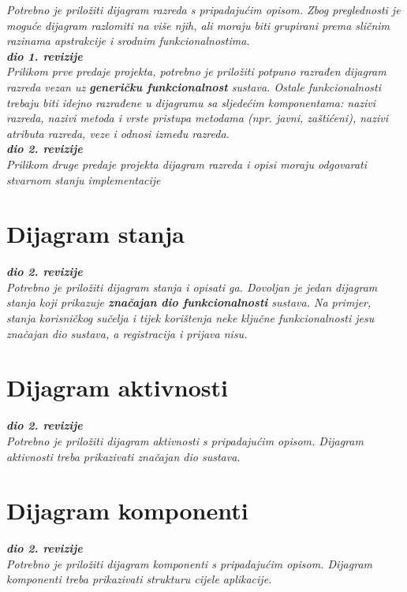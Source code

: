 			\textit{Potrebno je priložiti dijagram razreda s pripadajućim opisom. Zbog preglednosti je moguće dijagram razlomiti na više njih, ali moraju biti grupirani prema sličnim razinama apstrakcije i srodnim funkcionalnostima.}\\
			
			\textbf{\textit{dio 1. revizije}}\\
			
			\textit{Prilikom prve predaje projekta, potrebno je priložiti potpuno razrađen dijagram razreda vezan uz \textbf{generičku funkcionalnost} sustava. Ostale funkcionalnosti trebaju biti idejno razrađene u dijagramu sa sljedećim komponentama: nazivi razreda, nazivi metoda i vrste pristupa metodama (npr. javni, zaštićeni), nazivi atributa razreda, veze i odnosi između razreda.}\\
			
			\textbf{\textit{dio 2. revizije}}\\			
			
			\textit{Prilikom druge predaje projekta dijagram razreda i opisi moraju odgovarati stvarnom stanju implementacije}
			
			
			
			\eject
		
		\section{Dijagram stanja}
			
			
			\textbf{\textit{dio 2. revizije}}\\
			
			\textit{Potrebno je priložiti dijagram stanja i opisati ga. Dovoljan je jedan dijagram stanja koji prikazuje \textbf{značajan dio funkcionalnosti} sustava. Na primjer, stanja korisničkog sučelja i tijek korištenja neke ključne funkcionalnosti jesu značajan dio sustava, a registracija i prijava nisu. }
			
			
			\eject 
		
		\section{Dijagram aktivnosti}
			
			\textbf{\textit{dio 2. revizije}}\\
			
			 \textit{Potrebno je priložiti dijagram aktivnosti s pripadajućim opisom. Dijagram aktivnosti treba prikazivati značajan dio sustava.}
			
			\eject
		\section{Dijagram komponenti}
		
			\textbf{\textit{dio 2. revizije}}\\
		
			 \textit{Potrebno je priložiti dijagram komponenti s pripadajućim opisom. Dijagram komponenti treba prikazivati strukturu cijele aplikacije.}